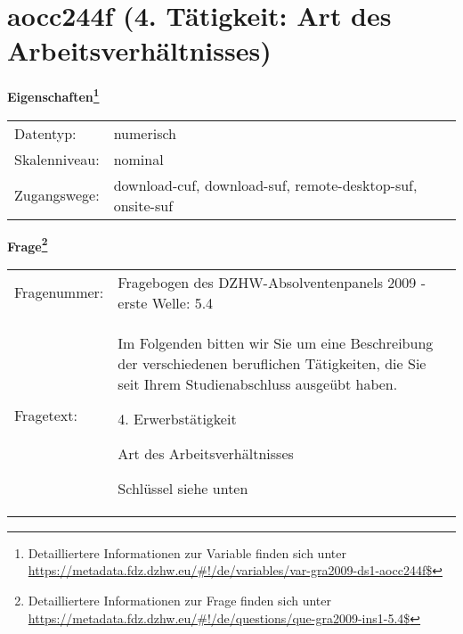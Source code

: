 
    \setcounter{footnote}{0}

    \vspace*{-1.8cm}
	\section{aocc244f (4. Tätigkeit: Art des Arbeitsverhältnisses)}
	\label{section:aocc244f}



    \vspace*{0.5cm}
    \noindent\textbf{Eigenschaften\footnote{Detailliertere Informationen zur Variable finden sich unter
		\url{https://metadata.fdz.dzhw.eu/\#!/de/variables/var-gra2009-ds1-aocc244f$}}}\\
	\begin{tabularx}{\hsize}{@{}lX}
	Datentyp: & numerisch \\
	Skalenniveau: & nominal \\
	Zugangswege: &
	  download-cuf, 
	  download-suf, 
	  remote-desktop-suf, 
	  onsite-suf
 \\
    \end{tabularx}



				\vspace*{0.5cm}
                \noindent\textbf{Frage\footnote{Detailliertere Informationen zur Frage finden sich unter
		              \url{https://metadata.fdz.dzhw.eu/\#!/de/questions/que-gra2009-ins1-5.4$}}}\\
				\begin{tabularx}{\hsize}{@{}lX}
					Fragenummer: &
					  Fragebogen des DZHW-Absolventenpanels 2009 - erste Welle:
					  5.4
 \\
					Fragetext: & Im Folgenden bitten wir Sie um eine Beschreibung der verschiedenen beruflichen Tätigkeiten, die Sie seit Ihrem Studienabschluss ausgeübt haben.\par  4. Erwerbstätigkeit\par  Art des Arbeitsverhältnisses\par  Schlüssel siehe unten \\
				\end{tabularx}





